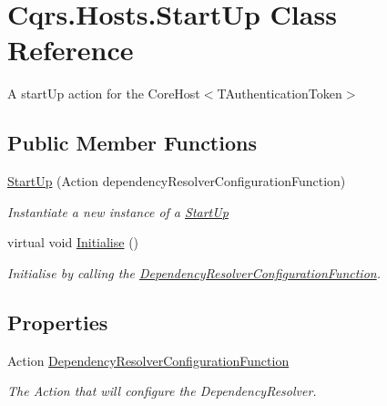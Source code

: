 \hypertarget{classCqrs_1_1Hosts_1_1StartUp}{}\section{Cqrs.\+Hosts.\+Start\+Up Class Reference}
\label{classCqrs_1_1Hosts_1_1StartUp}


A start\+Up action for the Core\+Host$<$\+T\+Authentication\+Token$>$  


\subsection*{Public Member Functions}
\begin{DoxyCompactItemize}
\item 
\hyperlink{classCqrs_1_1Hosts_1_1StartUp_a5f8292bb6d614027f7d7a8ce95aebc46_a5f8292bb6d614027f7d7a8ce95aebc46}{Start\+Up} (Action dependency\+Resolver\+Configuration\+Function)
\begin{DoxyCompactList}\small\item\em Instantiate a new instance of a \hyperlink{classCqrs_1_1Hosts_1_1StartUp}{Start\+Up} \end{DoxyCompactList}\item 
virtual void \hyperlink{classCqrs_1_1Hosts_1_1StartUp_ab2446f15d55a08163a2b158bb34c3fe2_ab2446f15d55a08163a2b158bb34c3fe2}{Initialise} ()
\begin{DoxyCompactList}\small\item\em Initialise by calling the \hyperlink{classCqrs_1_1Hosts_1_1StartUp_a73590d6dcba5b2d98cdb784d9e754db2_a73590d6dcba5b2d98cdb784d9e754db2}{Dependency\+Resolver\+Configuration\+Function}. \end{DoxyCompactList}\end{DoxyCompactItemize}
\subsection*{Properties}
\begin{DoxyCompactItemize}
\item 
Action \hyperlink{classCqrs_1_1Hosts_1_1StartUp_a73590d6dcba5b2d98cdb784d9e754db2_a73590d6dcba5b2d98cdb784d9e754db2}{Dependency\+Resolver\+Configuration\+Function}
\begin{DoxyCompactList}\small\item\em The Action that will configure the Dependency\+Resolver. \end{DoxyCompactList}\end{DoxyCompactItemize}


